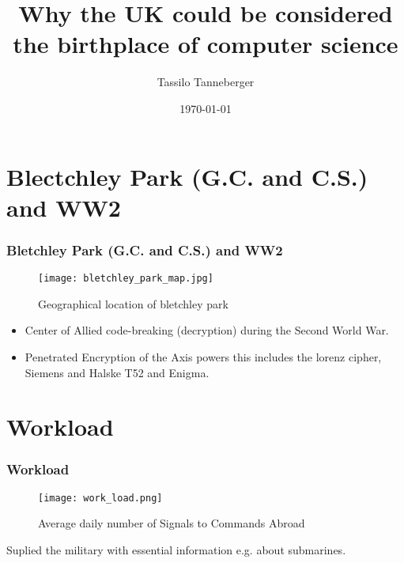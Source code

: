 \documentclass[10pt,]{beamer}
\title{Why the UK could be considered the birthplace of computer science}
\author{Tassilo Tanneberger}
\date{\today}
\begin{document}
\maketitle

\section{Blectchley Park (G.C. and C.S.) and WW2}
\begin{frame} %
	
  	\frametitle{Bletchley Park (G.C. and C.S.) and WW2 } %
	
	\begin{figure}		 
    	\texttt{[image: bletchley\_park\_map.jpg]}
    	\caption{Geographical location of bletchley park}
    	\label{fig:blectchley_park}
	\end{figure}		
	
	\begin{itemize}
		 \item Center of Allied code-breaking (decryption) during the Second World War. 
		 
		 \item Penetrated Encryption of the Axis powers this includes the lorenz cipher, Siemens and Halske T52 and Enigma.
		 
	\end{itemize}
	
\end{frame}

\section{Workload}
\begin{frame}[fragile] %
  	\frametitle{Workload} %

	\begin{figure}		 
    	\texttt{[image: work\_load.png]}
    	\caption{Average daily number of Signals to Commands Abroad }
		\label{fig:solve_statistics}
	\end{figure}
	
	Suplied the military with essential information e.g. about submarines.
	
\end{frame}
\end{document}
